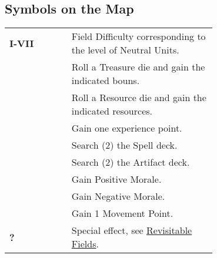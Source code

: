 
\begin{multicols*}{2}

\subsection*{Symbols on the Map}

\begingroup
  \renewcommand{\arraystretch}{1.5}
  \begin{tabularx}{\linewidth}{Y m{0.7\linewidth}}
    \small
    \mbox{\textbf{I-VII}} & Field Difficulty corresponding to the level of Neutral Units. \\
     & Roll a Treasure die and gain the indicated bouns. \\
     & Roll a Resource die and gain the indicated resources. \\
     & Gain one experience point. \\
     & Search (2) the Spell deck. \\
     & Search (2) the Artifact deck. \\
     & Gain Positive Morale. \\
     & Gain Negative Morale. \\
     & Gain 1 Movement Point. \\
    {\huge\textbf{?}} & Special effect, see \hyperlink{Revisitable}{Revisitable Fields}. \\
  \end{tabularx}
\endgroup

\bigskip


\end{multicols*}
